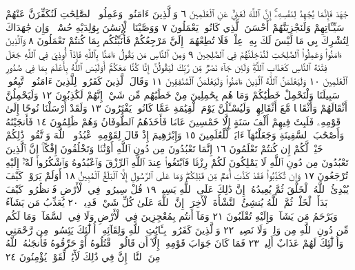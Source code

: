 جَٰهَدَ فَإِنَّمَا يُجَٰهِدُ لِنَفْسِهِۦٓۚ إِنَّ ٱللَّهَ لَغَنِيٌّ عَنِ ٱلْعَٰلَمِينَ ٦
وَٱلَّذِينَ ءَامَنُوا۟ وَعَمِلُوا۟ ٱلصَّٰلِحَٰتِ لَنُكَفِّرَنَّ عَنْهُمْ سَيِّـَٔاتِهِمْ
وَلَنَجْزِيَنَّهُمْ أَحْسَنَ ٱلَّذِي كَانُوا۟ يَعْمَلُونَ ٧ وَوَصَّيْنَا ٱلْإِنسَٰنَ
بِوَٰلِدَيْهِ حُسْنࣰاۖ وَإِن جَٰهَدَاكَ لِتُشْرِكَ بِي مَا لَيْسَ لَكَ بِهِۦ عِلْمࣱ
فَلَا تُطِعْهُمَآۚ إِلَيَّ مَرْجِعُكُمْ فَأُنَبِّئُكُم بِمَا كُنتُمْ تَعْمَلُونَ ٨
وَٱلَّذِينَ ءَامَنُوا۟ وَعَمِلُوا۟ ٱلصَّٰلِحَٰتِ لَنُدْخِلَنَّهُمْ فِي ٱلصَّٰلِحِينَ ٩
وَمِنَ ٱلنَّاسِ مَن يَقُولُ ءَامَنَّا بِٱللَّهِ فَإِذَآ أُوذِيَ فِي ٱللَّهِ جَعَلَ
فِتْنَةَ ٱلنَّاسِ كَعَذَابِ ٱللَّهِۖ وَلَئِن جَآءَ نَصْرࣱ مِّن رَّبِّكَ لَيَقُولُنَّ
إِنَّا كُنَّا مَعَكُمْۚ أَوَلَيْسَ ٱللَّهُ بِأَعْلَمَ بِمَا فِي صُدُورِ ٱلْعَٰلَمِينَ ١٠
وَلَيَعْلَمَنَّ ٱللَّهُ ٱلَّذِينَ ءَامَنُوا۟ وَلَيَعْلَمَنَّ ٱلْمُنَٰفِقِينَ ١١
وَقَالَ ٱلَّذِينَ كَفَرُوا۟ لِلَّذِينَ ءَامَنُوا۟ ٱتَّبِعُوا۟ سَبِيلَنَا
وَلْنَحْمِلْ خَطَٰيَٰكُمْ وَمَا هُم بِحَٰمِلِينَ مِنْ خَطَٰيَٰهُم مِّن
شَيْءٍۖ إِنَّهُمْ لَكَٰذِبُونَ ١٢ وَلَيَحْمِلُنَّ أَثْقَالَهُمْ وَأَثْقَالࣰا مَّعَ
أَثْقَالِهِمْۖ وَلَيُسْـَٔلُنَّ يَوْمَ ٱلْقِيَٰمَةِ عَمَّا كَانُوا۟ يَفْتَرُونَ ١٣
وَلَقَدْ أَرْسَلْنَا نُوحًا إِلَىٰ قَوْمِهِۦ فَلَبِثَ فِيهِمْ أَلْفَ سَنَةٍ
إِلَّا خَمْسِينَ عَامࣰا فَأَخَذَهُمُ ٱلطُّوفَانُ وَهُمْ ظَٰلِمُونَ ١٤
فَأَنجَيْنَٰهُ وَأَصْحَٰبَ ٱلسَّفِينَةِ وَجَعَلْنَٰهَآ ءَايَةࣰ لِّلْعَٰلَمِينَ ١٥
وَإِبْرَٰهِيمَ إِذْ قَالَ لِقَوْمِهِ ٱعْبُدُوا۟ ٱللَّهَ وَٱتَّقُوهُۖ ذَٰلِكُمْ
خَيْرࣱ لَّكُمْ إِن كُنتُمْ تَعْلَمُونَ ١٦ إِنَّمَا تَعْبُدُونَ مِن
دُونِ ٱللَّهِ أَوْثَٰنࣰا وَتَخْلُقُونَ إِفْكًاۚ إِنَّ ٱلَّذِينَ تَعْبُدُونَ مِن
دُونِ ٱللَّهِ لَا يَمْلِكُونَ لَكُمْ رِزْقࣰا فَٱبْتَغُوا۟ عِندَ ٱللَّهِ ٱلرِّزْقَ
وَٱعْبُدُوهُ وَٱشْكُرُوا۟ لَهُۥٓۖ إِلَيْهِ تُرْجَعُونَ ١٧ وَإِن تُكَذِّبُوا۟
فَقَدْ كَذَّبَ أُمَمࣱ مِّن قَبْلِكُمْۖ وَمَا عَلَى ٱلرَّسُولِ إِلَّا ٱلْبَلَٰغُ
ٱلْمُبِينُ ١٨ أَوَلَمْ يَرَوْا۟ كَيْفَ يُبْدِئُ ٱللَّهُ ٱلْخَلْقَ ثُمَّ
يُعِيدُهُۥٓۚ إِنَّ ذَٰلِكَ عَلَى ٱللَّهِ يَسِيرࣱ ١٩ قُلْ سِيرُوا۟ فِي ٱلْأَرْضِ
فَٱنظُرُوا۟ كَيْفَ بَدَأَ ٱلْخَلْقَۚ ثُمَّ ٱللَّهُ يُنشِئُ ٱلنَّشْأَةَ ٱلْأٓخِرَةَۚ
إِنَّ ٱللَّهَ عَلَىٰ كُلِّ شَيْءࣲ قَدِيرࣱ ٢٠ يُعَذِّبُ مَن يَشَآءُ وَيَرْحَمُ
مَن يَشَآءُۖ وَإِلَيْهِ تُقْلَبُونَ ٢١ وَمَآ أَنتُم بِمُعْجِزِينَ فِي
ٱلْأَرْضِ وَلَا فِي ٱلسَّمَآءِۖ وَمَا لَكُم مِّن دُونِ ٱللَّهِ مِن
وَلِيࣲّ وَلَا نَصِيرࣲ ٢٢ وَٱلَّذِينَ كَفَرُوا۟ بِـَٔايَٰتِ ٱللَّهِ وَلِقَآئِهِۦٓ
أُو۟لَٰٓئِكَ يَئِسُوا۟ مِن رَّحْمَتِي وَأُو۟لَٰٓئِكَ لَهُمْ عَذَابٌ أَلِيمࣱ ٢٣
فَمَا كَانَ جَوَابَ قَوْمِهِۦٓ إِلَّآ أَن قَالُوا۟ ٱقْتُلُوهُ أَوْ حَرِّقُوهُ
فَأَنجَىٰهُ ٱللَّهُ مِنَ ٱلنَّارِۚ إِنَّ فِي ذَٰلِكَ لَأٓيَٰتࣲ لِّقَوْمࣲ يُؤْمِنُونَ ٢٤
